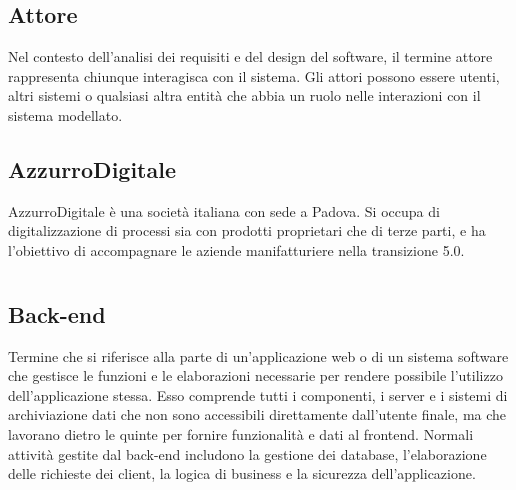 \hypertarget{sec:attore}{}
\subsection*{Attore}
Nel contesto dell'analisi dei requisiti e del design del software, il termine attore rappresenta chiunque interagisca con il sistema. Gli attori possono 
essere utenti, altri sistemi o qualsiasi altra entità che abbia un ruolo nelle interazioni con il sistema modellato.

\subsection*{AzzurroDigitale}
AzzurroDigitale è una società italiana con sede a Padova. Si occupa di digitalizzazione di processi sia con prodotti proprietari che di terze parti, e 
ha l’obiettivo di accompagnare le aziende manifatturiere nella transizione 5.0.

\newpage



\section{}

\hypertarget{sec:back-end}{}
\subsection*{Back-end}
Termine che si riferisce alla parte di un'applicazione web o di un sistema software che gestisce le funzioni e le 
elaborazioni necessarie per rendere possibile l'utilizzo dell'applicazione stessa. Esso comprende tutti i componenti, 
i server e i sistemi di archiviazione dati che non sono accessibili direttamente dall'utente finale, ma che lavorano 
dietro le quinte per fornire funzionalità e dati al frontend. Normali attività gestite dal back-end includono la 
gestione dei database, l'elaborazione delle richieste dei client, la logica di business e la sicurezza 
dell'applicazione.


